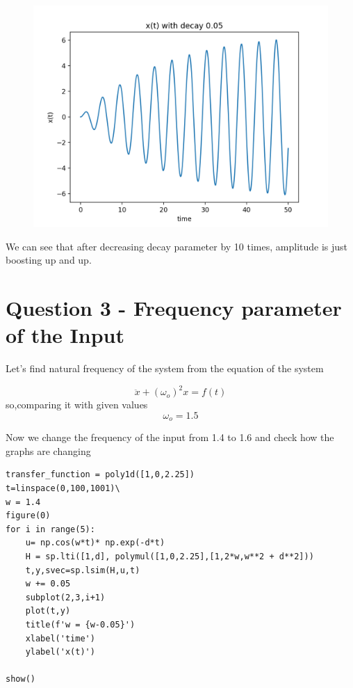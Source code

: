 \documentclass[12pt, a4paper]{report}
\begin{document}
\begin{figure}[!tbh]
   	\centering
   	\includegraphics[scale=0.85]{Q2.png}
 \end{figure} 
 
 We can see that after decreasing decay parameter by 10 times, amplitude is just boosting up and up.
 
  \section*{Question 3 - Frequency parameter of the Input}
Let's find natural frequency of the system from the equation of the system

 \begin{equation}
  \ddot x + (\omega_o)^2x = f(t)
\end{equation}
so,comparing it with given values
 \begin{equation}
  \omega_o = 1.5
\end{equation}

Now we change the frequency of the input from 1.4 to 1.6 and check how the graphs are changing

\begin{Verbatim}
transfer_function = poly1d([1,0,2.25])
t=linspace(0,100,1001)\
w = 1.4
figure(0)
for i in range(5):
    u= np.cos(w*t)* np.exp(-d*t)
    H = sp.lti([1,d], polymul([1,0,2.25],[1,2*w,w**2 + d**2]))
    t,y,svec=sp.lsim(H,u,t)
    w += 0.05
    subplot(2,3,i+1)
    plot(t,y)
    title(f'w = {w-0.05}')
    xlabel('time')
    ylabel('x(t)')

show()
\end{Verbatim}
\end{document}
